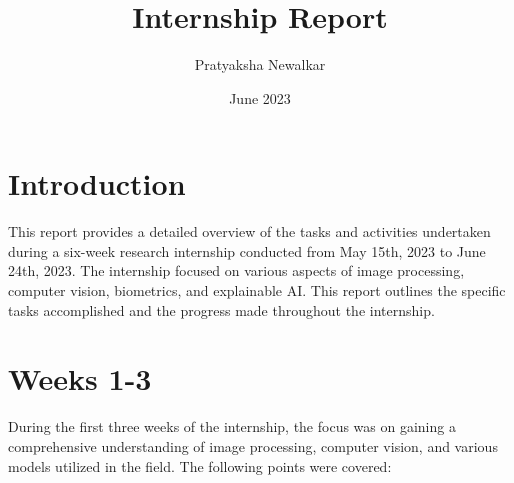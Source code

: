\documentclass{article}
\author{Pratyaksha Newalkar}
\date{June 2023}
\title{Internship Report}
\begin{document}
\maketitle


\section{Introduction}
This report provides a detailed overview of the tasks and activities undertaken during a six-week research internship conducted from 
May 15th, 2023 to June 24th, 2023. The internship focused on various aspects of image processing, computer vision, biometrics, 
and explainable AI. This report outlines the specific tasks accomplished and the progress made throughout the internship.
\section{Weeks 1-3}
During the first three weeks of the internship, the focus was on gaining a comprehensive understanding of image processing, computer vision, and various models utilized in 
the field. The following points were covered:
\end{document}
